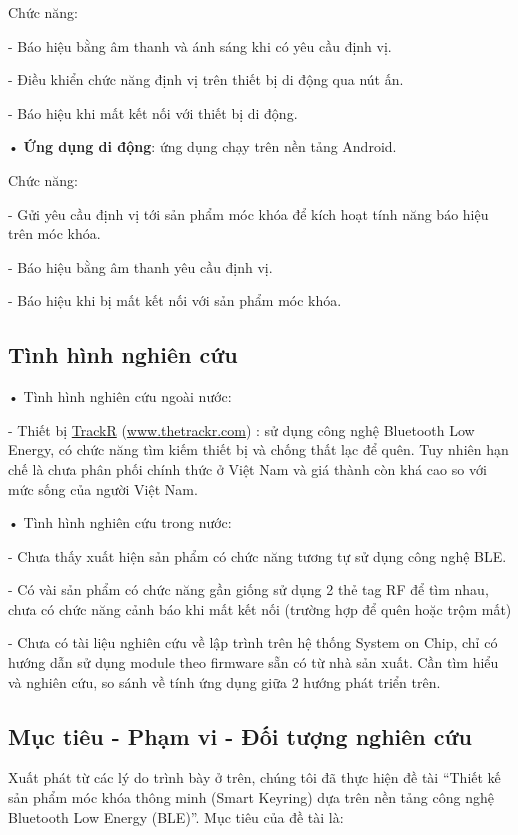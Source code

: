 Chức năng:

- Báo hiệu bằng âm thanh và ánh sáng khi có yêu cầu định vị.

- Điều khiển chức năng định vị trên thiết bị di động qua nút ấn.
	
- Báo hiệu khi mất kết nối với thiết bị di động.
		

• \textbf{Ứng dụng di động}: ứng dụng chạy trên nền tảng Android. 

Chức năng:

- Gửi yêu cầu định vị tới sản phẩm móc khóa để kích hoạt tính năng báo hiệu trên móc khóa.

- Báo hiệu bằng âm thanh yêu cầu định vị.

- Báo hiệu khi bị mất kết nối với sản phẩm móc khóa.

\subsection{Tình hình nghiên cứu}

• Tình hình nghiên cứu ngoài nước:

- Thiết bị \href{www.thetrackr.com}{TrackR} 
(\url{www.thetrackr.com}) : sử dụng công nghệ Bluetooth Low Energy, có chức năng tìm kiếm thiết bị và chống thất lạc để quên. Tuy nhiên hạn chế là chưa phân phối chính thức ở Việt Nam và giá thành còn khá cao so với mức sống của người Việt Nam.

• Tình hình nghiên cứu trong nước:

- Chưa thấy xuất hiện sản phẩm có chức năng tương tự sử dụng công nghệ BLE.

- Có vài sản phẩm có chức năng gần giống sử dụng 2 thẻ tag RF để tìm nhau, chưa có chức năng cảnh báo khi mất kết nối (trường hợp để quên hoặc trộm mất)

- Chưa có tài liệu nghiên cứu về lập trình trên hệ thống System on Chip, chỉ có hướng dẫn sử dụng module theo firmware sẵn có từ nhà sản xuất. Cần tìm hiểu và nghiên cứu, so sánh về tính ứng dụng giữa 2 hướng phát triển trên. 

\subsection{Mục tiêu - Phạm vi - Đối tượng nghiên cứu}

Xuất phát từ các lý do trình bày ở trên, chúng tôi đã thực hiện đề tài “Thiết kế sản phẩm móc khóa thông minh (Smart Keyring) dựa trên nền tảng công nghệ Bluetooth Low Energy (BLE)”. Mục tiêu của đề tài là:

